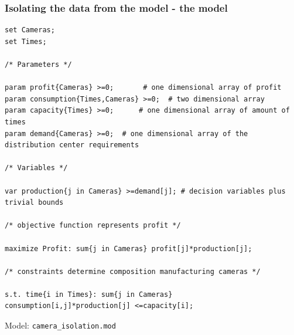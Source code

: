 \documentclass[landscape]{beamer}
\begin{document}
\begin{frame}[fragile]
  \frametitle{Isolating  the data from the model - the model} 
\begin{tiny}
\begin{verbatim}
set Cameras; 
set Times;

/* Parameters */

param profit{Cameras} >=0;       # one dimensional array of profit
param consumption{Times,Cameras} >=0;  # two dimensional array
param capacity{Times} >=0;      # one dimensional array of amount of times
param demand{Cameras} >=0;  # one dimensional array of the distribution center requirements 

/* Variables */ 

var production{j in Cameras} >=demand[j]; # decision variables plus trivial bounds

/* objective function represents profit */

maximize Profit: sum{j in Cameras} profit[j]*production[j];

/* constraints determine composition manufacturing cameras */

s.t. time{i in Times}: sum{j in Cameras} consumption[i,j]*production[j] <=capacity[i]; 
\end{verbatim}
\end{tiny}
Model:  \verb=camera_isolation.mod=
\end{frame} 
 
\end{document}

